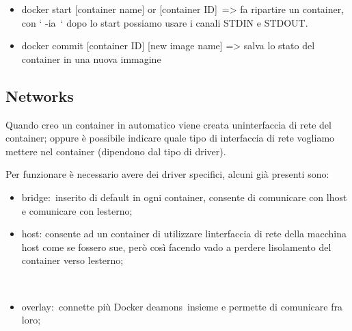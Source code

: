 \documentclass[
]{article}
\providecommand{\tightlist}{%
  \setlength{\itemsep}{0pt}\setlength{\parskip}{0pt}}
\begin{document}
\begin{itemize}
\tightlist
\item
  {docker start {[}container name{]} or {[}container
  ID{]}}{~=\textgreater{} fa ripartire un container, con ` }{-ia}{~`
  dopo lo start possiamo usare i canali STDIN e STDOUT.}
\end{itemize}

{}

\begin{itemize}
\tightlist
\item
  {docker commit {[}container ID{]} {[}new image name{]}
  }{=\textgreater{} salva lo stato del container in una nuova immagine}
\end{itemize}

{}

{}

\subsection{\texorpdfstring{{Networks}}{Networks}}\label{h.h3bzngxffdw4}

{Quando creo un container in automatico viene creata
un\textquotesingle interfaccia di rete del container; oppure è possibile
indicare quale tipo di interfaccia di rete vogliamo mettere nel
container (dipendono dal tipo di driver).}

{Per funzionare è necessario avere dei driver specifici, alcuni già
presenti sono: }

{}

\begin{itemize}
\tightlist
\item
  {bridge}{:}{~}{inserito di default in ogni container, consente di
  comunicare con l\textquotesingle host e comunicare con
  l\textquotesingle esterno}{;}
\end{itemize}

{}

\begin{itemize}
\tightlist
\item
  {host}{: consente ad un container di utilizzare
  l\textquotesingle interfaccia di rete della macchina host come se
  fossero sue, però così facendo vado a perdere
  l\textquotesingle isolamento del container verso
  l\textquotesingle esterno;}
\end{itemize}

{~}

\begin{itemize}
\tightlist
\item
  {overlay}{:}{~}{connette più Docker }{deamons}{~insieme e permette di
  comunicare fra loro}{;}
\end{itemize}
\end{document}

